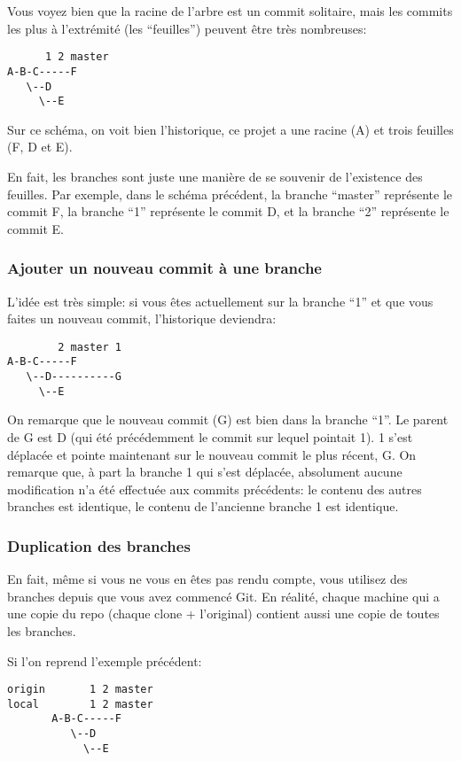 \documentclass[10pt,a4paper]{article}
\begin{document}
Vous voyez bien que la racine de l'arbre est un commit solitaire, mais les commits les plus à l'extrémité (les ``feuilles'') peuvent être très nombreuses:

\begin{verbatim}
      1 2 master
A-B-C-----F
   \--D
     \--E
\end{verbatim}

Sur ce schéma, on voit bien l'historique, ce projet a une racine (A) et trois feuilles (F, D et E).

En fait, les branches sont juste une manière de se souvenir de l'existence des feuilles. Par exemple, dans le schéma précédent, la branche ``master'' représente le commit F, la branche ``1'' représente le commit D, et la branche ``2'' représente le commit E.

\subsubsection{Ajouter un nouveau commit à une branche}

L'idée est très simple: si vous êtes actuellement sur la branche ``1'' et que vous faites un nouveau commit, l'historique deviendra:

\begin{verbatim}
        2 master 1
A-B-C-----F
   \--D----------G
     \--E
\end{verbatim}

On remarque que le nouveau commit (G) est bien dans la branche ``1''. Le parent de G est D (qui été précédemment le commit sur lequel pointait 1). 1 s'est déplacée et pointe maintenant sur le nouveau commit le plus récent, G. On remarque que, à part la branche 1 qui s'est déplacée, absolument aucune modification n'a été effectuée aux commits précédents: le contenu des autres branches est identique, le contenu de l'ancienne branche 1 est identique.

\subsubsection{Duplication des branches}

En fait, même si vous ne vous en êtes pas rendu compte, vous utilisez des branches depuis que vous avez commencé Git. En réalité, chaque machine qui a une copie du repo (chaque clone + l'original) contient aussi une copie de toutes les branches.

Si l'on reprend l'exemple précédent:

\begin{verbatim}
origin       1 2 master
local        1 2 master
       A-B-C-----F
          \--D
            \--E
\end{verbatim}
\end{document}
